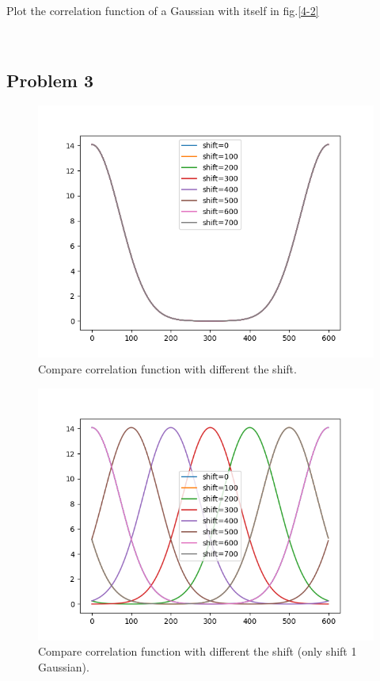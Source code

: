 \documentclass[showpacs, oneside, onecolumn, prl, amsmath, amssymb, nofootinbib, superscriptaddress, notitlepage]{revtex4-1}
\newcommand\bfig{\begin{figure}}
\newcommand\efig{\end{figure}}
\begin{document}
Plot the correlation function of a Gaussian with itself in fig.\ref{4-2}

~~~~

\subsection{Problem 3}

\bfig
	\centering
	\includegraphics[scale=0.85]{4-3.png}
	\caption{Compare correlation function with different the shift.}
	\label{4-3}
\efig

\bfig
	\centering
	\includegraphics[scale=0.85]{4-3-2.png}
	\caption{Compare correlation function with different the shift (only shift 1 Gaussian).}
	\label{4-3-2}
\efig
\end{document}
